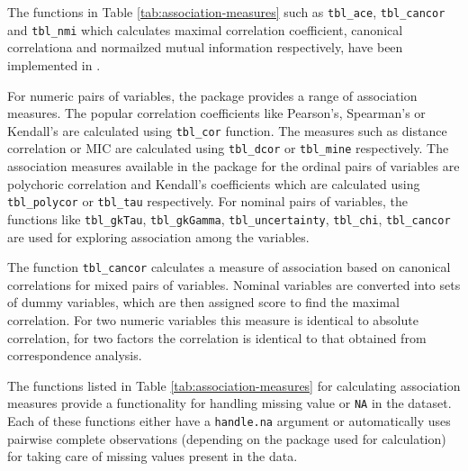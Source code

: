 The functions in Table \ref{tab:association-measures} such as
\texttt{tbl\_ace}, \texttt{tbl\_cancor} and \texttt{tbl\_nmi} which
calculates maximal correlation coefficient, canonical correlationa and
normailzed mutual information respectively, have been implemented in
.

For numeric pairs of variables, the package provides a range of
association measures. The popular correlation coefficients like
Pearson's, Spearman's or Kendall's are calculated using
\texttt{tbl\_cor} function. The measures such as distance correlation or
MIC are calculated using \texttt{tbl\_dcor} or \texttt{tbl\_mine}
respectively. The association measures available in the package for the
ordinal pairs of variables are polychoric correlation and Kendall's
coefficients which are calculated using \texttt{tbl\_polycor} or
\texttt{tbl\_tau} respectively. For nominal pairs of variables, the
functions like \texttt{tbl\_gkTau}, \texttt{tbl\_gkGamma},
\texttt{tbl\_uncertainty}, \texttt{tbl\_chi}, \texttt{tbl\_cancor} are
used for exploring association among the variables.

The function \texttt{tbl\_cancor} calculates a measure of association
based on canonical correlations for mixed pairs of variables. Nominal
variables are converted into sets of dummy variables, which are then
assigned score to find the maximal correlation. For two numeric
variables this measure is identical to absolute correlation, for two
factors the correlation is identical to that obtained from
correspondence analysis.

The functions listed in Table \ref{tab:association-measures} for
calculating association measures provide a functionality for handling
missing value or \texttt{NA} in the dataset. Each of these functions
either have a \texttt{handle.na} argument or automatically uses pairwise
complete observations (depending on the package used for calculation)
for taking care of missing values present in the data.

